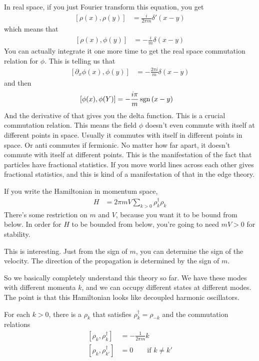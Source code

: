 In real space,
if you just Fourier transform this equation,
you get
\begin{align}
    \left[ 
    \rho(x), \rho(y)
    \right]
    &=
    \frac{i}{2\pi m}
    \delta'\left( x - y \right)
\end{align}
which means that
\begin{align}
    \left[ \rho(x), \phi(y) \right]
    &=
    -\frac{i}{m} \delta\left( x - y \right)
\end{align}
You can actually integrate it one more time
to get the real space commutation relation for $\phi$.
This is telling us that
\begin{align}
    \left[ \partial_x \phi(x), \phi(y) \right]
    &=
    -\frac{2\pi i}{m} \delta\left( x - y \right)
\end{align}
and then
\begin{align}
    \left[ \phi(x), \phi(Y) \right]
    &=
    -\frac{i\pi}{m} \operatorname{sgn}\left( x - y \right)
\end{align}
And the derivative of that gives you the delta function.
This is a crucial commutation relation.
This means the field $\phi$ doesn't even commute with itself at different points
in space.
Usually it commutes with itself in different points in space.
Or anti commutes if fermionic.
No matter how far apart,
it doesn't commute with itself at different points.
This is the manifestation of the fact that particles have fractional statistics.
If you move world lines across each other gives fractional statistics,
and this is kind of a manifestation of that in the edge theory.

If you write the Hamiltonian in momentum space,
\begin{align}
    H &=
    2\pi m V
    \sum_{k> 0}
    \rho_k^\dagger \rho_k
\end{align}
There's some restriction on $m$ and $V$,
because you want it to be bound from below.
In order for $H$ to be bounded from below,
you're going to need $mV>0$ for stability.

This is interesting.
Just from the sign of $m$,
you can determine the sign of the velocity.
The direction of the propagation is determined by the sign of $m$.

So we basically completely understand this theory so far.
We have these modes with different momenta $k$,
and we can occupy different states at different modes.
The point is that this Hamiltonian looks like decoupled harmonic oscillators.

For each $k>0$,
there is a $\rho_k$ that satisfies $\rho_k^\dagger = \rho_{-k}$
and the commutation relations
\begin{align}
    \left[ \rho_k, \rho_k^\dagger \right]
    &=
    -\frac{1}{2\pi m} k\\
    \left[ \rho_k, \rho_{k'}^\dagger \right] &= 0
    \qquad\text{if }k \ne k'
\end{align}

